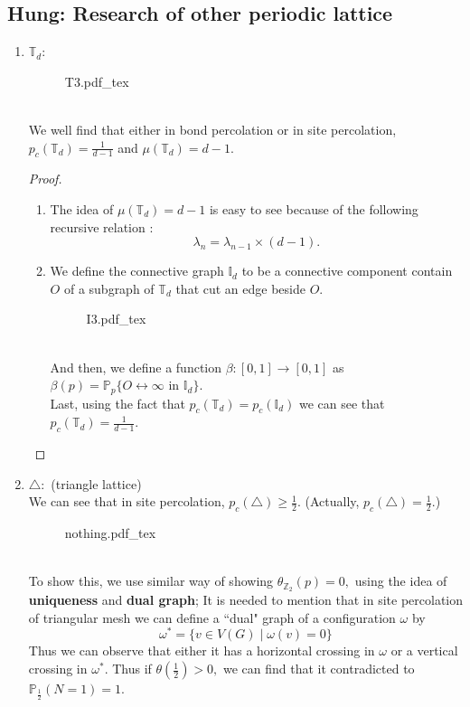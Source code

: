 \documentclass[12pt]{article}
\theoremstyle{plane}
\theoremstyle{definition}
\newcommand{\inccfig}[1]{%
{#1.pdf_tex}
}
\begin{document}
\subsection*{Hung: Research of other periodic lattice}
\begin{enumerate}
    \item $\mathbb{T}_d:$
	\begin{figure}[htp]
	\centering
	\def\svgwidth{7cm}
	\inccfig{T3}
	\end{figure}\\
	We well find that either in bond percolation or in site percolation, $p_c(\mathbb{T}_d)=\frac{1}{d-1}$ and $ \mu(\mathbb{T}_d)=d-1.$
	\begin{proof}
	\begin{enumerate}
	    \item The idea of $\mu(\mathbb{T}_d)=d-1$ is easy to see because of the following recursive relation : 
	    \[
	    \lambda_n=\lambda_{n-1}\times(d-1).
	    \]
	    \item We define the connective graph $\mathbb{I}_d$ to be a connective component contain $O$ of a subgraph of $\mathbb{T}_d$ that cut an edge beside $O.$
    	\begin{figure}[htp]
    	\centering
    	\def\svgwidth{7cm}
    	\inccfig{I3}
    	\end{figure}\\
    	And then, we define a function $\beta:[0,1]\to [0,1]$ as $\beta(p)=\mathbb{P}_p\{O\leftrightarrow\infty\mbox{ in }\mathbb{I}_d\}.$\\
    	Last, using the fact that $p_c(\mathbb{T}_d)=p_c(\mathbb{I}_d)$ we can see that $p_c(\mathbb{T}_d)=\frac{1}{d-1}.$
	\end{enumerate}
	\end{proof}
	\item $\triangle:$ (triangle lattice)\\[5pt]
	We can see that in site percolation, $p_c(\triangle)\geq \frac{1}{2}.$ (Actually, $p_c(\triangle)=\frac{1}{2}.$)
	\begin{figure}[htp]
	\centering
	\def\svgwidth{7cm}
	\inccfig{nothing}
	\end{figure}\\
	To show this, we use similar way of showing $\theta_{\mathbb{Z}_2}(p)=0,$ using the idea of \textbf{uniqueness} and \textbf{dual graph}; It is needed to mention that in site percolation of triangular mesh we can define a ``dual" graph of a configuration $\omega$ by 
	\[
	\omega^*=\{v\in V(G)\mid \omega(v)=0\}
	\]
	Thus we can observe that either it has a horizontal crossing in $\omega$ or a vertical crossing in $\omega^*.$ Thus if $\theta(\frac{1}{2})>0,$ we can find that it contradicted to $\mathbb{P}_{\frac{1}{2}}(N=1)=1.$
\end{enumerate}
\vspace{1cm}
\end{document}
